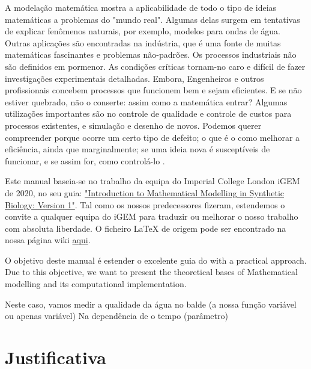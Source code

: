 \documentclass[11pt, letterpaper, portuguese]{article}
\begin{document}
\par{A modelação matemática mostra a aplicabilidade de todo o tipo de ideias matemáticas a problemas do "mundo real".
Algumas delas surgem em tentativas de explicar fenômenos naturais, por exemplo, modelos para ondas de água. Outras aplicações são encontradas na indústria, que é uma fonte de muitas matemáticas fascinantes e problemas não-padrões. Os processos industriais não são definidos em pormenor. As condições críticas tornam-no caro e difícil de fazer investigações experimentais detalhadas. Embora, Engenheiros e outros profissionais concebem processos que funcionem bem e sejam eficientes. E se não estiver quebrado, não o conserte: assim como a matemática entrar? Algumas utilizações importantes são no controle de qualidade e controle de custos para processos existentes, e simulação e desenho de novos. Podemos querer compreender porque ocorre um certo tipo de defeito; o que é o
como melhorar a eficiência, ainda que marginalmente; se uma ideia nova é
susceptíveis de funcionar, e se assim for, como controlá-lo
 \cite{Howison_2008}.}

\par{Este manual baseia-se no trabalho da equipa do Imperial College London iGEM de 2020, no seu guia: \href{https://static.igem.org/mediawiki/2020/9/96/T--Imperial_College--introtomodelling.pdf}{"Introduction to Mathematical Modelling in Synthetic Biology: Version 1"}. Tal como os nossos predecessores fizeram, estendemos o convite a qualquer equipa do iGEM para traduzir ou melhorar o nosso trabalho com absoluta liberdade. O ficheiro LaTeX de origem pode ser encontrado na nossa página wiki \href{https://github.com/Rexmali/iGEM-UAM2022}{aqui}.}

\par{O objetivo deste manual é estender o excelente guia do \cite{igem_2020} with a practical approach. Due to this objective, we want to present the theoretical bases of Mathematical modelling and its computational implementation.}

\par{Neste caso, vamos medir a qualidade da água no balde (a nossa função variável ou apenas variável) Na dependência de
o tempo (parâmetro)
}

\newpage

\section{Justificativa}
\end{document}
